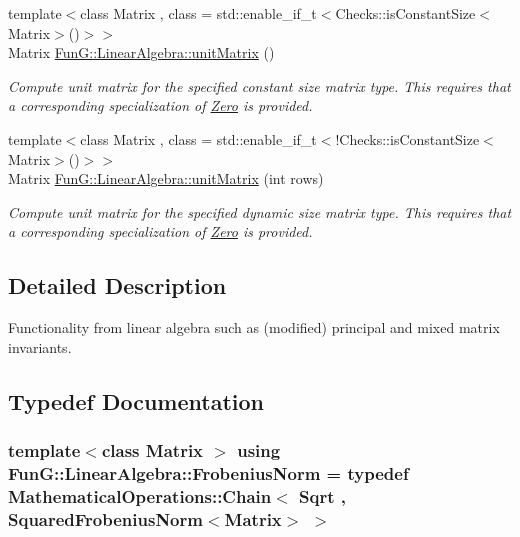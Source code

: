 \begin{DoxyCompactItemize}
{\footnotesize template$<$class Matrix , class  = std\+::enable\+\_\+if\+\_\+t$<$\+Checks\+::is\+Constant\+Size$<$\+Matrix$>$()$>$$>$ }\\Matrix \hyperlink{group__LinearAlgebraGroup_ga88a596b8526c0ed98ce241244fb85948}{Fun\+G\+::\+Linear\+Algebra\+::unit\+Matrix} ()
\begin{DoxyCompactList}\small\item\em Compute unit matrix for the specified constant size matrix type. This requires that a corresponding specialization of \hyperlink{structFunG_1_1Zero}{Zero} is provided. \end{DoxyCompactList}\item 
{\footnotesize template$<$class Matrix , class  = std\+::enable\+\_\+if\+\_\+t$<$!\+Checks\+::is\+Constant\+Size$<$\+Matrix$>$()$>$$>$ }\\Matrix \hyperlink{group__LinearAlgebraGroup_gae50c49f62ed072019079a7563688e5de}{Fun\+G\+::\+Linear\+Algebra\+::unit\+Matrix} (int rows)
\begin{DoxyCompactList}\small\item\em Compute unit matrix for the specified dynamic size matrix type. This requires that a corresponding specialization of \hyperlink{structFunG_1_1Zero}{Zero} is provided. \end{DoxyCompactList}\end{DoxyCompactItemize}


\subsection{Detailed Description}
Functionality from linear algebra such as (modified) principal and mixed matrix invariants. 



\subsection{Typedef Documentation}
\hypertarget{group__LinearAlgebraGroup_gad209833e37a25e863fe72868d37795b8}{}
\subsubsection[{Frobenius\+Norm}]{\setlength{\rightskip}{0pt plus 5cm}template$<$class Matrix $>$ using {\bf Fun\+G\+::\+Linear\+Algebra\+::\+Frobenius\+Norm} = typedef Mathematical\+Operations\+::\+Chain$<$ Sqrt , Squared\+Frobenius\+Norm$<$Matrix$>$ $>$}\label{group__LinearAlgebraGroup_gad209833e37a25e863fe72868d37795b8}


